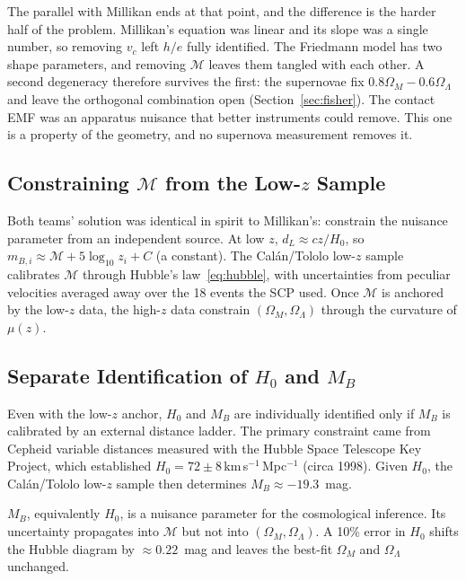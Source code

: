 \documentclass[12pt]{article}
\begin{document}
The parallel with Millikan ends at that point, and the difference is the
harder half of the problem.  Millikan's equation was linear and its slope was
a single number, so removing $v_c$ left $h/e$ fully identified.  The Friedmann
model has two shape parameters, and removing $\mathcal{M}$ leaves them tangled
with each other.  A second degeneracy therefore survives the first: the
supernovae fix $0.8\Omega_M - 0.6\Omega_\Lambda$ and leave the orthogonal
combination open (Section~\ref{sec:fisher}).  The contact EMF was an
apparatus nuisance that better instruments could remove.  This one is a
property of the geometry, and no supernova measurement removes it.

\subsection{Constraining $\mathcal{M}$ from the Low-$z$ Sample}

Both teams' solution was identical in spirit to Millikan's: constrain
the nuisance parameter from an independent source.  At low $z$,
$d_L \approx cz/H_0$, so $m_{B,i} \approx \mathcal{M} +
5\log_{10}z_i + C$ (a constant).  The Cal\'an/Tololo low-$z$ sample
calibrates $\mathcal{M}$ through Hubble's law~\eqref{eq:hubble}, with
uncertainties from peculiar velocities averaged away over the 18 events the
SCP used.  Once $\mathcal{M}$ is anchored by the low-$z$ data, the
high-$z$ data constrain $(\Omega_M,\Omega_\Lambda)$ through the
curvature of $\mu(z)$.

\subsection{Separate Identification of $H_0$ and $M_B$}

Even with the low-$z$ anchor,  $H_0$ and $M_B$ are individually
identified only if $M_B$ is calibrated by an external distance ladder.
The primary constraint came from Cepheid variable distances measured
with the Hubble Space Telescope Key Project, which established
$H_0 = 72 \pm 8$\,km\,s$^{-1}$\,Mpc$^{-1}$ (circa 1998).  Given $H_0$,
the Cal\'an/Tololo low-$z$ sample then determines $M_B \approx -19.3$~mag.

$M_B$, equivalently $H_0$, is a nuisance parameter for the cosmological
inference.  Its uncertainty propagates into $\mathcal{M}$ but not into
$(\Omega_M,\Omega_\Lambda)$.  A 10\% error in $H_0$ shifts the Hubble diagram
by $\approx 0.22$~mag and leaves the best-fit $\Omega_M$ and $\Omega_\Lambda$
unchanged.
\end{document}

